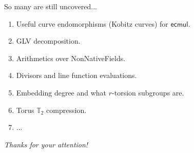 \documentclass[xcolor={usenames,dvipsnames}]{beamer}
\begin{document}
    \begin{frame}{So many are still uncovered...}
        \begin{enumerate}
            \item Useful curve endomorphisms (Kobitz curves) for $\boldsymbol{\mathsf{ecmul}}$.
            \item GLV decomposition.
            \item Arithmetics over NonNativeFields.
            \item Divisors and line function evaluations.
            \item Embedding degree and what $r$-torsion subgroups are.
            \item Torus $\mathbb{T}_2$ compression.
            \item ...
        \end{enumerate}
    \end{frame}
    
	\begin{frame}{}
      \centering \Large
      \emph{Thanks for your attention!}
    \end{frame}
\end{document}
